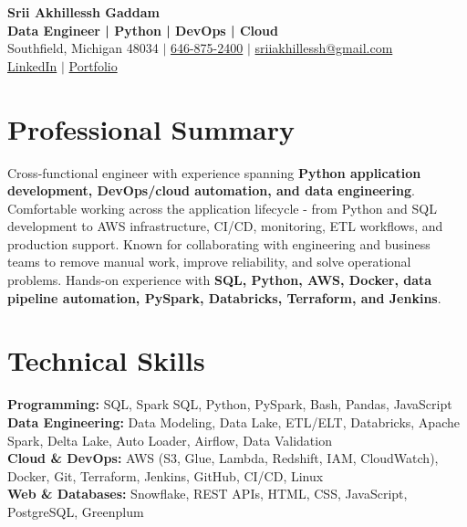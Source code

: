 \documentclass[letterpaper,10pt]{article}
\begin{document}
\fontsize{9.35pt}{10.45pt}\selectfont

\begin{center}
    {\LARGE \textbf{Srii Akhillessh Gaddam}} \\[-1pt]
    \textbf{Data Engineer | Python | DevOps | Cloud} \\[2pt]
    Southfield, Michigan 48034 $|$
    \href{tel:6468752400}{646-875-2400} $|$
    \href{mailto:sriiakhillessh@gmail.com}{sriiakhillessh@gmail.com} \\[1pt]
    \href{https://www.linkedin.com/in/srii-akhiilessh-gaddam-b48668191/}{LinkedIn} $|$
    \href{https://sriiakhillesshg.github.io/portfolio/}{Portfolio}
\end{center}
\vspace{-8pt}

\section{Professional Summary}
\small{Cross-functional engineer with experience spanning \textbf{Python application development, DevOps/cloud automation, and data engineering}. Comfortable working across the application lifecycle - from Python and SQL development to AWS infrastructure, CI/CD, monitoring, ETL workflows, and production support. Known for collaborating with engineering and business teams to remove manual work, improve reliability, and solve operational problems. Hands-on experience with \textbf{SQL, Python, AWS, Docker, data pipeline automation, PySpark, Databricks, Terraform, and Jenkins}.}

\section{Technical Skills}
\small{
\textbf{Programming:} SQL, Spark SQL, Python, PySpark, Bash, Pandas, JavaScript \\
\textbf{Data Engineering:} Data Modeling, Data Lake, ETL/ELT, Databricks, Apache Spark, Delta Lake, Auto Loader, Airflow, Data Validation \\
\textbf{Cloud \& DevOps:} AWS (S3, Glue, Lambda, Redshift, IAM, CloudWatch), Docker, Git, Terraform, Jenkins, GitHub, CI/CD, Linux \\
\textbf{Web \& Databases:} Snowflake, REST APIs, HTML, CSS, JavaScript, PostgreSQL, Greenplum
}
\end{document}
